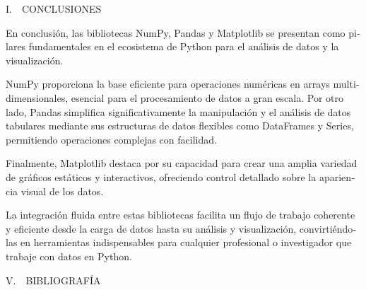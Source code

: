 \documentclass[letterpaper]{article}
\begin{document}
\begin{multicols}{2}



\bigskip





\bigskip


\bigskip


\bigskip


\bigskip

{
I.\ \ CONCLUSIONES}

{
\foreignlanguage{spanish}{En conclusión, las bibliotecas NumPy, Pandas y Matplotlib se presentan como pilares
fundamentales en el ecosistema de Python para el análisis de datos y la visualización. }}


\bigskip

{
\foreignlanguage{spanish}{NumPy proporciona la base eficiente para operaciones numéricas en arrays multidimensionales,
esencial para el procesamiento de datos a gran escala. Por otro lado, Pandas simplifica significativamente la
manipulación y el análisis de datos tabulares mediante sus estructuras de datos flexibles como DataFrames y Series,
permitiendo operaciones complejas con facilidad. }}


\bigskip

{
\foreignlanguage{spanish}{Finalmente, Matplotlib destaca por su capacidad para crear una amplia variedad de gráficos
estáticos y interactivos, ofreciendo control detallado sobre la apariencia visual de los datos. }}


\bigskip

{
\foreignlanguage{spanish}{La integración fluida entre estas bibliotecas facilita un flujo de trabajo coherente y
eficiente desde la carga de datos hasta su análisis y visualización, convirtiéndolas en herramientas indispensables
para cualquier profesional o investigador que trabaje con datos en Python.}}


\bigskip


\bigskip

{
\foreignlanguage{english}{V.\ \ BIBLIOGRAFÍA}}


\bigskip


\end{multicols}
\end{document}
